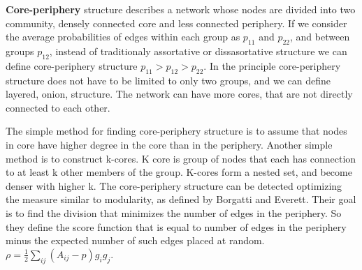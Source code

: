 

\textbf{Core-periphery} structure describes a network whose nodes are divided into two community, densely connected core and less connected periphery. If we consider the average probabilities of edges within each group as $p_{11}$ and $p_{22}$, and between groups $p_{12}$, instead of traditionaly assortative or dissasortative structure we can define core-periphery structure $p_{11}> p_{12} > p_{22}$. In the principle core-periphery structure does not have to be limited to only two groups, and we can define layered, onion, structure. The network can have more cores, that are not directly connected to each other. 

The simple method for finding core-periphery structure is to assume that nodes in core have higher degree in the core than in the periphery. Another simple method is to construct k-cores. K core is group of nodes that each has connection to at least k other members of the group. K-cores form a nested set, and become denser with higher k. The core-periphery structure can be detected optimizing the measure similar to modularity, as defined by Borgatti and Everett. Their goal is to find the division that minimizes the number of edges in the periphery. So they define the score function that is equal to number of edges in the periphery minus the expected number of such edges placed at random. $\rho = \frac{1}{2}\sum_{ij}(A_{ij}-p)g_ig_j$.

